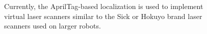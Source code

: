 \begin{figure}
{{%



Currently, the AprilTag-based localization is used to implement virtual laser scanners similar to the Sick or Hokuyo brand laser scanners used on larger robots. 


}}
\end{figure}
